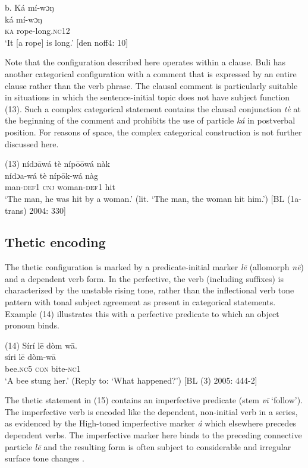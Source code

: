 \documentclass[output=paper]{langsci/langscibook}
\begin{document}
\ea
\glll         \textup{ b.}  Ká  mí-wɔŋ\\
  \textup{ká  mí-wɔŋ}\\
     \textsc{ka}  rope-long.\textsc{nc}12\\
\glt   ‘It [a rope] is long.’ [den noff4: 10]
\z

Note that the configuration described here operates within a clause. Buli has another categorical configuration with a comment that is expressed by an entire clause rather than the verb phrase. The clausal comment is particularly suitable in situations in which the sentence-initial topic does not have subject function (13). Such a complex categorical statement contains the clausal conjunction \textit{tè} at the beginning of the comment and prohibits the use of particle \textit{ká }in postverbal position.\textit{ }For reasons of space, the complex categorical construction is not further discussed here.

\ea
\gll \textup{(13)}  nídɔ\={a}wá  tè  níp\={o}\={o}wá  nàk\\
  \textup{  nídɔa-wá  tè  níp\={o}k-wá  nàg}\\
\glt man-\textsc{def}1  \textsc{cnj}  woman-\textsc{def}1  hit\\
‘The man, he was hit by a woman.’ (lit. ‘The man, the woman hit him.’) [BL (1a-trans) 2004: 330] 
\z

\subsection{Thetic encoding}

The thetic configuration is marked by a predicate-initial marker \textit{l\={e}} (allomorph \textit{n\={e}}) and a dependent verb form. In the perfective, the verb (including suffixes) is characterized by the unstable rising tone, rather than the inflectional verb tone pattern with tonal subject agreement as present in categorical statements. Example (14) illustrates this with a perfective predicate to which an object pronoun binds.

\ea
\glll \textup{(14)}  Sírí    l\={e}  dòm  w\={a}.\\
  \textup{  síri    l\={e}  dòm-w\={a}}\\
       bee.\textsc{nc}5  \textsc{con}  bite-\textsc{nc}1\\
\glt ‘A bee stung her.’ (Reply to: ‘What happened?’) [BL (3) 2005: 444-2]
\z

The thetic statement in (15) contains an imperfective predicate (stem \textit{v\={i} }‘follow’). The imperfective verb is encoded like the dependent, non-initial verb in a series, as evidenced by the High-toned imperfective marker \textit{á} which elsewhere precedes dependent verbs. The imperfective marker here binds to the preceding connective particle \textit{l\={e} }and the resulting form is often subject to considerable and irregular surface tone changes \citep{Schwarz2007}.
\end{document}

